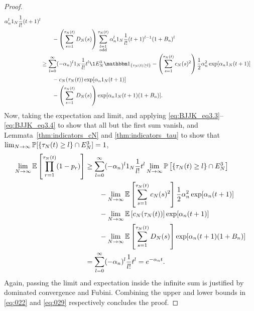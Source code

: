 \begin{proof}
\begin{align}
        \alpha_n^l \ON \frac{1}{l!} (t+1)^l \notag\\
    &\qquad- \left( \sum_{s=1}^{\tau_N(t)} D_N(s) \right)
        \sum_{\substack{l=1 \\ \text{odd} }}^{\tau_N(t)} 
        \alpha_n^l \ON \frac{1}{l!} (t+1)^{l-1} (1+B_n)^l \notag\\
&\geq \sum_{l=0}^{\infty} (-\alpha_n)^l \ON 
        \frac{1}{l!} t^l \1{E_N^3} \I{ \tau_N(t) \geq l}
        - \left( \sum_{s=1}^{\tau_N(t)} c_N(s)^2 \right)
        \frac{1}{2} \alpha_n^2 \exp[ \alpha_n \ON (t+1) ]\notag\\
    &\qquad- c_N(\tau_N(t)) \exp[ \alpha_n \ON (t+1) ] \notag\\
    &\qquad- \left( \sum_{s=1}^{\tau_N(t)} D_N(s) \right)
        \exp[ \alpha_n \ON (t+1) (1+B_n) ]. \label{eq:028}
\end{align}
Now, taking the expectation and limit, and applying \eqref{eq:BJJK_eq3.3}--\eqref{eq:BJJK_eq3.4} to show that all but the first sum vanish, and Lemmata~\ref{thm:indicators_cN} and \ref{thm:indicators_tau} to show that $\lim_{N\to\infty} \mathbb{P}[ \{\tau_N(t) \geq l\} \cap E_N^3 ] =1$,
\begin{align}
\lim_{N\to\infty} \mathbb{E} \left[ \prod_{r=1}^{\tau_N(t)} (1-p_r) \right]
&\geq \sum_{l=0}^{\infty} (-\alpha_n)^l 1_N \frac{1}{l!} t^l 
        \lim_{N\to\infty} \mathbb{P}\left[ \{\tau_N(t) \geq l\} \cap E_N^3 \right] \notag\\
    &\qquad- \lim_{N\to\infty} \mathbb{E} \left[ \sum_{s=1}^{\tau_N(t)} c_N(s)^2 \right]
        \frac{1}{2} \alpha_n^2 \exp[ \alpha_n (t+1) ]\notag\\
    &\qquad- \lim_{N\to\infty} \mathbb{E} \left[ c_N(\tau_N(t)) \right] 
        \exp[ \alpha_n (t+1) ] \notag\\
    &\qquad- \lim_{N\to\infty} \mathbb{E} \left[ \sum_{s=1}^{\tau_N(t)} D_N(s) \right]
        \exp[ \alpha_n (t+1) (1+B_n) ] \notag\\
&= \sum_{l=0}^{\infty} (-\alpha_n)^l \frac{1}{l!} t^l
= e^{-\alpha_n t}. \label{eq:029}
\end{align}
Again, passing the limit and expectation inside the infinite sum is justified by dominated convergence and Fubini.
Combining the upper and lower bounds in \eqref{eq:022} and \eqref{eq:029} respectively concludes the proof.
\end{proof}



